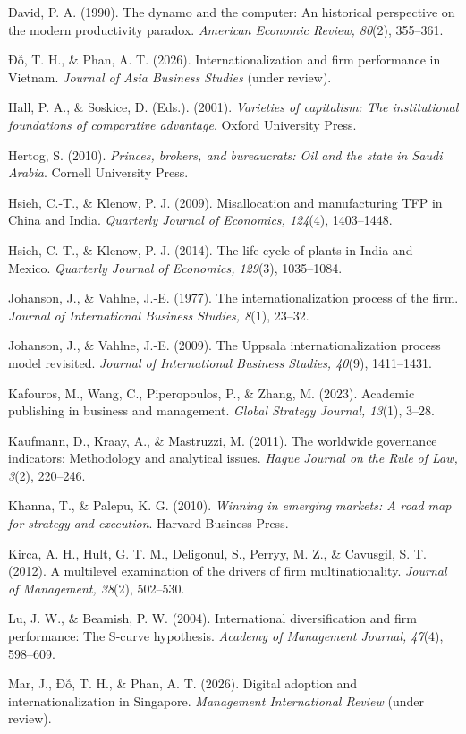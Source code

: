 \documentclass[12pt,a4paper]{article}
\begin{document}
David, P. A. (1990). The dynamo and the computer: An historical
perspective on the modern productivity paradox. \emph{American Economic
Review, 80}(2), 355--361.

Đỗ, T. H., \& Phan, A. T. (2026). Internationalization and firm
performance in Vietnam. \emph{Journal of Asia Business Studies} (under
review).

Hall, P. A., \& Soskice, D. (Eds.). (2001). \emph{Varieties of
capitalism: The institutional foundations of comparative advantage}.
Oxford University Press.

Hertog, S. (2010). \emph{Princes, brokers, and bureaucrats: Oil and the
state in Saudi Arabia}. Cornell University Press.

Hsieh, C.-T., \& Klenow, P. J. (2009). Misallocation and manufacturing
TFP in China and India. \emph{Quarterly Journal of Economics, 124}(4),
1403--1448.

Hsieh, C.-T., \& Klenow, P. J. (2014). The life cycle of plants in India
and Mexico. \emph{Quarterly Journal of Economics, 129}(3), 1035--1084.

Johanson, J., \& Vahlne, J.-E. (1977). The internationalization process
of the firm. \emph{Journal of International Business Studies, 8}(1),
23--32.

Johanson, J., \& Vahlne, J.-E. (2009). The Uppsala internationalization
process model revisited. \emph{Journal of International Business
Studies, 40}(9), 1411--1431.

Kafouros, M., Wang, C., Piperopoulos, P., \& Zhang, M. (2023). Academic
publishing in business and management. \emph{Global Strategy Journal,
13}(1), 3--28.

Kaufmann, D., Kraay, A., \& Mastruzzi, M. (2011). The worldwide
governance indicators: Methodology and analytical issues. \emph{Hague
Journal on the Rule of Law, 3}(2), 220--246.

Khanna, T., \& Palepu, K. G. (2010). \emph{Winning in emerging markets:
A road map for strategy and execution}. Harvard Business Press.

Kirca, A. H., Hult, G. T. M., Deligonul, S., Perryy, M. Z., \& Cavusgil,
S. T. (2012). A multilevel examination of the drivers of firm
multinationality. \emph{Journal of Management, 38}(2), 502--530.

Lu, J. W., \& Beamish, P. W. (2004). International diversification and
firm performance: The S-curve hypothesis. \emph{Academy of Management
Journal, 47}(4), 598--609.

Mar, J., Đỗ, T. H., \& Phan, A. T. (2026). Digital adoption and
internationalization in Singapore. \emph{Management International
Review} (under review).
\end{document}
